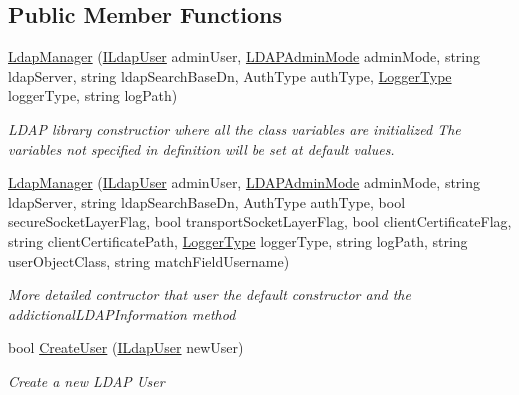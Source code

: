 \subsection*{Public Member Functions}
\begin{DoxyCompactItemize}
\item 
\hyperlink{class_l_d_a_p_library_1_1_ldap_manager_a0ff65da13648e0203ef513bb9a0a2639}{Ldap\+Manager} (\hyperlink{interface_l_d_a_p_library_1_1_interfarces_1_1_i_ldap_user}{I\+Ldap\+User} admin\+User, \hyperlink{namespace_l_d_a_p_library_1_1_enums_aaaf5c3ff906b84752d719f58d502f15e}{L\+D\+A\+P\+Admin\+Mode} admin\+Mode, string ldap\+Server, string ldap\+Search\+Base\+Dn, Auth\+Type auth\+Type, \hyperlink{namespace_l_d_a_p_library_1_1_logger_a398123fc2bb2443d0e0821044d077795}{Logger\+Type} logger\+Type, string log\+Path)
\begin{DoxyCompactList}\small\item\em L\+D\+A\+P library constructior where all the class variables are initialized The variables not specified in definition will be set at default values. \end{DoxyCompactList}\item 
\hyperlink{class_l_d_a_p_library_1_1_ldap_manager_a7dafc6f2dc5723529dd62cfbf270a105}{Ldap\+Manager} (\hyperlink{interface_l_d_a_p_library_1_1_interfarces_1_1_i_ldap_user}{I\+Ldap\+User} admin\+User, \hyperlink{namespace_l_d_a_p_library_1_1_enums_aaaf5c3ff906b84752d719f58d502f15e}{L\+D\+A\+P\+Admin\+Mode} admin\+Mode, string ldap\+Server, string ldap\+Search\+Base\+Dn, Auth\+Type auth\+Type, bool secure\+Socket\+Layer\+Flag, bool transport\+Socket\+Layer\+Flag, bool client\+Certificate\+Flag, string client\+Certificate\+Path, \hyperlink{namespace_l_d_a_p_library_1_1_logger_a398123fc2bb2443d0e0821044d077795}{Logger\+Type} logger\+Type, string log\+Path, string user\+Object\+Class, string match\+Field\+Username)
\begin{DoxyCompactList}\small\item\em More detailed contructor that user the default constructor and the addictional\+L\+D\+A\+P\+Information method \end{DoxyCompactList}\item 
bool \hyperlink{class_l_d_a_p_library_1_1_ldap_manager_a7994edb46c98bcea6fe778c7e36b809c}{Create\+User} (\hyperlink{interface_l_d_a_p_library_1_1_interfarces_1_1_i_ldap_user}{I\+Ldap\+User} new\+User)
\begin{DoxyCompactList}\small\item\em Create a new L\+D\+A\+P User \end{DoxyCompactList}\item 

\end{DoxyCompactItemize}
